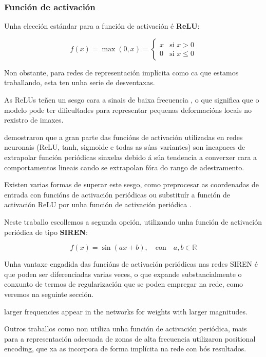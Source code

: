 \subsubsection{Función de activación}
\label{subsubsec:Función de activación}

Unha elección estándar para a función de activación é \textbf{ReLU}:

\[
f(x) = \max(0, x) = \begin{cases} 
x & \text{si } x > 0 \\ 
0 & \text{si } x \leq 0 
\end{cases}
\]

Non obstante, para redes de representación implícita como ca que estamos traballando, esta ten unha serie de desventaxas.

As ReLUs teñen un sesgo cara a sinais de baixa frecuencia \cite{rahaman2019spectralbiasneuralnetworks}, 
 o que significa que o modelo pode ter dificultades para representar pequenas deformacións locais no rexistro de imaxes.
 
\cite{ziyin2020neuralnetworksfaillearn} demostraron que a gran parte das funcións de activación utilizadas en redes neuronais (ReLU, tanh, sigmoide e todas as súas variantes)
son incapaces de extrapolar función periódicas sinxelas debido á súa tendencia a converxer cara a comportamentos lineais cando se extrapolan fóra do rango de adestramento. 

Existen varias formas de superar este sesgo, como preprocesar as coordenadas de entrada con funcións de activación periódicas \cite{mildenhall2020nerfrepresentingscenesneural} 
ou substituír a función de activación ReLU por unha función de activación periódica \cite{sitzmann2020implicitneuralrepresentationsperiodic}.

Neste traballo escollemos a segunda opción, utilizando unha función de activación periódica de tipo \textbf{SIREN}:

\[
f(x) = \sin(ax + b), \quad \text{con} \quad a, b \in \mathbb{R}
\]

Unha vantaxe engadida das funcións de activación periódicas nas redes SIREN é que poden ser diferenciadas varias veces, 
o que expande substancialmente o conxunto de termos de regularización que se poden empregar na rede, como veremos na seguinte sección.

larger frequencies appear in the networks for weights with larger magnitudes.

Outros traballos como \cite{mildenhall2020nerfrepresentingscenesneural} non utiliza unha función de activación periódica, mais para a representación adecuada de zonas de alta frecuencia 
utilizaron positional encoding, que xa as incorpora de forma implícita na rede con bós resultados. 

